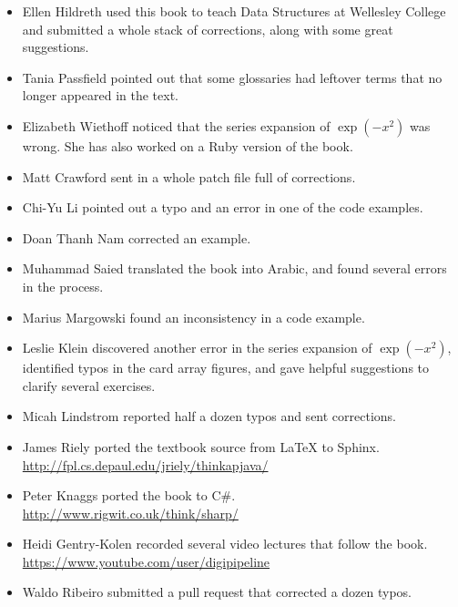 \begin{itemize}

\item Ellen Hildreth used this book to teach Data Structures at Wellesley College and submitted a whole stack of corrections, along with some great suggestions.

\item Tania Passfield pointed out that some glossaries had leftover terms that no longer appeared in the text.

\item Elizabeth Wiethoff noticed that the series expansion of $\exp(-x^2)$ was wrong.
She has also worked on a Ruby version of the book.

\item Matt Crawford sent in a whole patch file full of corrections.

\item Chi-Yu Li pointed out a typo and an error in one of the code examples.

\item Doan Thanh Nam corrected an example.

\item Muhammad Saied translated the book into Arabic, and found several errors in the process.

\item Marius Margowski found an inconsistency in a code example.

\item Leslie Klein discovered another error in the series expansion of $\exp(-x^2)$, identified typos in the card array figures, and gave helpful suggestions to clarify several exercises.

\item Micah Lindstrom reported half a dozen typos and sent corrections.

\item James Riely ported the textbook source from LaTeX to Sphinx.
\\ \url{http://fpl.cs.depaul.edu/jriely/thinkapjava/}

\item Peter Knaggs ported the book to C\#.
\\ \url{http://www.rigwit.co.uk/think/sharp/}

\item Heidi Gentry-Kolen recorded several video lectures that follow the book.
\\ \url{https://www.youtube.com/user/digipipeline}

\item Waldo Ribeiro submitted a pull request that corrected a dozen typos.
\end{itemize}

